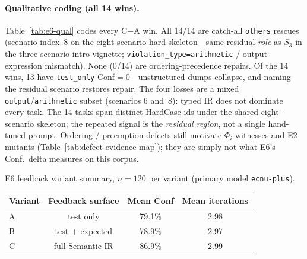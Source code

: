 





\paragraph{Qualitative coding (all 14 wins).}
Table~\ref{tab:e6-qual} codes every C$-$A win.
All 14/14 are catch-all \texttt{others} rescues (scenario index~8 on the
eight-scenario hard skeleton---same residual \emph{role} as $S_3$ in the
three-scenario intro vignette;
\texttt{violation\_type=arithmetic} / output-expression mismatch).
None (0/14) are ordering-precedence repairs.
Of the 14 wins, 13 have \texttt{test\_only} Conf${=}0$---unstructured dumps
collapse, and naming the residual scenario restores repair.
The four losses are a mixed \texttt{output}/\texttt{arithmetic} subset
(scenarios 6 and~8): typed IR does not dominate every task.
The 14 tasks span distinct HardCase ids under the shared eight-scenario
skeleton; the repeated signal is the \emph{residual region}, not a single
hand-tuned prompt.
Ordering / preemption defects still motivate $\Phi_i$ witnesses and E2
mutants (Table~\ref{tab:defect-evidence-map}); they are simply not what E6's
Conf.\ delta measures on this corpus.



\begin{inlinetable}{E6 feedback variant summary, $n=120$ per variant
  (primary model \texttt{ecnu-plus}).}
  \label{tab:feedback-e6}
  \begin{tabular}{lccc}
    \toprule
    Variant & Feedback surface & Mean Conf & Mean iterations \\
    \midrule
    A & test only           & 79.1\% & 2.98 \\
    B & test + expected     & 78.9\% & 2.97 \\
    C & full Semantic IR    & 86.9\% & 2.99 \\
    \bottomrule
  \end{tabular}
\end{inlinetable}




